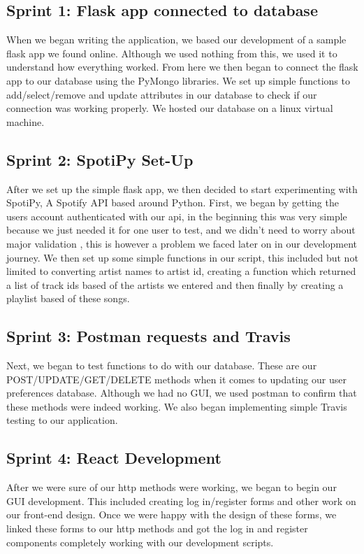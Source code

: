 \subsection{Sprint 1: Flask app connected to database}
When we began writing the application, we based our development of a sample flask app we found online. Although we used nothing from this, we used it to understand how everything worked. From here we then began to connect the flask app to our database using the PyMongo libraries. We set up simple functions to add/select/remove and update attributes in our database to check if our connection was working properly. We hosted our database on a linux virtual machine.

\subsection{Sprint 2: SpotiPy Set-Up}
After we set up the simple flask app, we then decided to start experimenting with SpotiPy, A Spotify API based around Python. First, we began by getting the users account authenticated with our api, in the beginning this was very simple because we just needed it for one user to test, and we didn’t need to worry about major validation , this is however a problem we faced later on in our development journey. We then set up some simple functions in our script, this included but not limited to converting artist names to artist id, creating a function which returned a list of track ids based of the artists we entered and then finally by creating a playlist based of these songs.

\subsection{Sprint 3: Postman requests and Travis}
Next, we began to test functions to do with our database. These are our POST/UPDATE/GET/DELETE methods when it comes to updating our user preferences database. Although we had no GUI, we used postman to confirm that these methods were indeed working. We also began implementing simple Travis testing to our application.

\subsection{Sprint 4: React Development}
After we were sure of our http methods were working, we began to begin our GUI development. This included creating log in/register forms and other work on our front-end design. Once we were happy with the design of these forms, we linked these forms to our http methods and got the log in and register components completely working with our development scripts.

